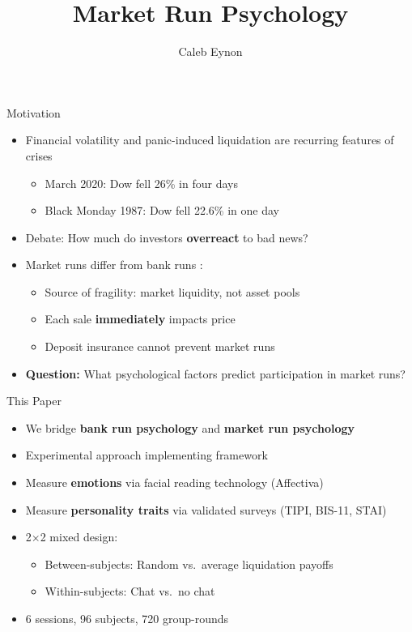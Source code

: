 \documentclass{beamer}
\title[Market Run Psychology]{Market Run Psychology}
\author[Eynon]{Caleb Eynon}
\institute[]{
  University of Alabama
}
\date[] %
{}
\begin{document}
\frame{\titlepage}


\begin{frame}{Motivation}
\begin{itemize}
    \item Financial volatility and panic-induced liquidation are recurring features of crises
    \begin{itemize}
        \item March 2020: Dow fell 26\% in four days
        \item Black Monday 1987: Dow fell 22.6\% in one day
    \end{itemize}
    \item Debate: How much do investors \textbf{overreact} to bad news?
    \item Market runs differ from bank runs \citep{bernardo2004liquidity}:
    \begin{itemize}
        \item Source of fragility: market liquidity, not asset pools
        \item Each sale \textbf{immediately} impacts price
        \item Deposit insurance cannot prevent market runs
    \end{itemize}
    \item \textbf{Question:} What psychological factors predict participation in market runs?
\end{itemize}
\end{frame}


\begin{frame}{This Paper}
\begin{itemize}
    \item We bridge \textbf{bank run psychology} and \textbf{market run psychology}
    \item Experimental approach implementing \cite{bernardo2004liquidity} framework
    \item Measure \textbf{emotions} via facial reading technology (Affectiva)
    \item Measure \textbf{personality traits} via validated surveys (TIPI, BIS-11, STAI)
    \item 2$\times$2 mixed design:
    \begin{itemize}
        \item Between-subjects: Random vs.\ average liquidation payoffs
        \item Within-subjects: Chat vs.\ no chat
    \end{itemize}
    \item 6 sessions, 96 subjects, 720 group-rounds
\end{itemize}
\end{frame}
\end{document}
